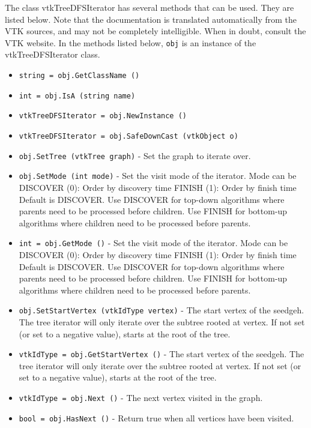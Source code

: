 The class vtkTreeDFSIterator has several methods that can be used.
  They are listed below.
Note that the documentation is translated automatically from the VTK sources,
and may not be completely intelligible.  When in doubt, consult the VTK website.
In the methods listed below, \verb|obj| is an instance of the vtkTreeDFSIterator class.
\begin{itemize}
\item  \verb|string = obj.GetClassName ()|

\item  \verb|int = obj.IsA (string name)|

\item  \verb|vtkTreeDFSIterator = obj.NewInstance ()|

\item  \verb|vtkTreeDFSIterator = obj.SafeDownCast (vtkObject o)|

\item  \verb|obj.SetTree (vtkTree graph)| -  Set the graph to iterate over.

\item  \verb|obj.SetMode (int mode)| -  Set the visit mode of the iterator.  Mode can be
   DISCOVER (0): Order by discovery time
   FINISH   (1): Order by finish time
 Default is DISCOVER.
 Use DISCOVER for top-down algorithms where parents need to be processed before children.
 Use FINISH for bottom-up algorithms where children need to be processed before parents.

\item  \verb|int = obj.GetMode ()| -  Set the visit mode of the iterator.  Mode can be
   DISCOVER (0): Order by discovery time
   FINISH   (1): Order by finish time
 Default is DISCOVER.
 Use DISCOVER for top-down algorithms where parents need to be processed before children.
 Use FINISH for bottom-up algorithms where children need to be processed before parents.

\item  \verb|obj.SetStartVertex (vtkIdType vertex)| -  The start vertex of the seedgeh.
 The tree iterator will only iterate over the subtree rooted at vertex.
 If not set (or set to a negative value), starts at the root of the tree.

\item  \verb|vtkIdType = obj.GetStartVertex ()| -  The start vertex of the seedgeh.
 The tree iterator will only iterate over the subtree rooted at vertex.
 If not set (or set to a negative value), starts at the root of the tree.

\item  \verb|vtkIdType = obj.Next ()| -  The next vertex visited in the graph.

\item  \verb|bool = obj.HasNext ()| -  Return true when all vertices have been visited.

\end{itemize}
